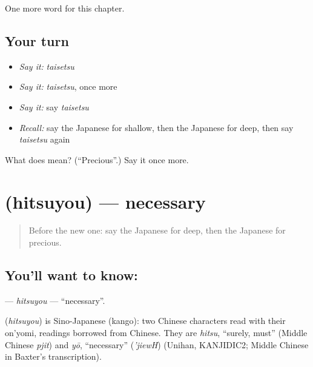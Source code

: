 \begin{grammarlens}[title={What you've built}]
One more word for this chapter.
\end{grammarlens}

\subsection*{Your turn}
\begin{itemize}
\raggedright
  \item \emph{Say it:} \emph{taisetsu}
  \item \emph{Say it:} \emph{taisetsu}, once more
  \item \emph{Say it:} say \emph{taisetsu}
  \item \emph{Recall:} say the Japanese for shallow, then the Japanese for deep, then say \emph{taisetsu} again
\end{itemize}

\begin{tcolorbox}[breakable,colback=teal!4,colframe=teal!35!black,title={Before you move on}]
What does  mean? (\textquotedblleft{}Precious\textquotedblright{}.) Say it once more.
\end{tcolorbox}
\section[\texorpdfstring{\ja{ひつよう} (hitsuyou)}{ひつよう (hitsuyou)}]{ (hitsuyou) — necessary}

\label{lesson:JA-C122-hitsuyou}



\begin{quote}
Before the new one: say the Japanese for deep, then the Japanese for precious.
\end{quote}

\subsection*{You'll want to know: }
\textbf{} — \emph{hitsuyou} — \textquotedblleft{}necessary\textquotedblright{}.

\begin{cousinweb}
\textbf{} (\emph{hitsuyou}) is Sino-Japanese (kango): two Chinese characters read with their on'yomi, readings borrowed from Chinese. They are \emph{hitsu}, \textquotedblleft{}surely, must\textquotedblright{} (Middle Chinese \emph{pjit}) and \emph{yō}, \textquotedblleft{}necessary\textquotedblright{} (\emph{'jiewH}) (Unihan, KANJIDIC2; Middle Chinese in Baxter's transcription).
\end{cousinweb}

